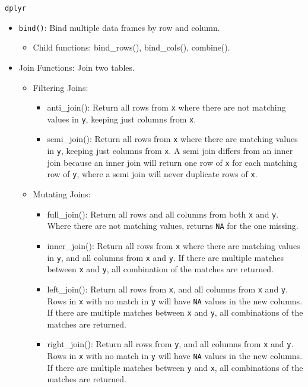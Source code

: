 \documentclass[]{book}
\providecommand{\tightlist}{%
  \setlength{\itemsep}{0pt}\setlength{\parskip}{0pt}}
\theoremstyle{definition}
\theoremstyle{definition}
\theoremstyle{definition}
\theoremstyle{remark}
\begin{document}
\texttt{dplyr}

\begin{itemize}
\tightlist
\item
  \texttt{bind()}: Bind multiple data frames by row and column.

  \begin{itemize}
  \tightlist
  \item
    Child functions: bind\_rows(), bind\_cols(), combine().
  \end{itemize}
\item
  Join Functions: Join two tables.

  \begin{itemize}
  \tightlist
  \item
    Filtering Joins:

    \begin{itemize}
    \tightlist
    \item
      anti\_join(): Return all rows from \texttt{x} where there are not
      matching values in \texttt{y}, keeping just columns from
      \texttt{x}.
    \item
      semi\_join(): Return all rows from \texttt{x} where there are
      matching values in \texttt{y}, keeping just columns from
      \texttt{x}. A semi join differs from an inner join because an
      inner join will return one row of \texttt{x} for each matching row
      of \texttt{y}, where a semi join will never duplicate rows of
      \texttt{x}.
    \end{itemize}
  \item
    Mutating Joins:

    \begin{itemize}
    \tightlist
    \item
      full\_join(): Return all rows and all columns from both \texttt{x}
      and \texttt{y}. Where there are not matching values, returns
      \texttt{NA} for the one missing.
    \item
      inner\_join(): Return all rows from \texttt{x} where there are
      matching values in \texttt{y}, and all columns from \texttt{x} and
      \texttt{y}. If there are multiple matches between \texttt{x} and
      \texttt{y}, all combination of the matches are returned.
    \item
      left\_join(): Return all rows from \texttt{x}, and all columns
      from \texttt{x} and \texttt{y}. Rows in \texttt{x} with no match
      in \texttt{y} will have \texttt{NA} values in the new columns. If
      there are multiple matches between \texttt{x} and \texttt{y}, all
      combinations of the matches are returned.
    \item
      right\_join(): Return all rows from \texttt{y}, and all columns
      from \texttt{x} and \texttt{y}. Rows in \texttt{x} with no match
      in \texttt{y} will have \texttt{NA} values in the new columns. If
      there are multiple matches between \texttt{y} and \texttt{x}, all
      combinations of the matches are returned.
    \end{itemize}
  \end{itemize}
\end{itemize}
\end{document}
